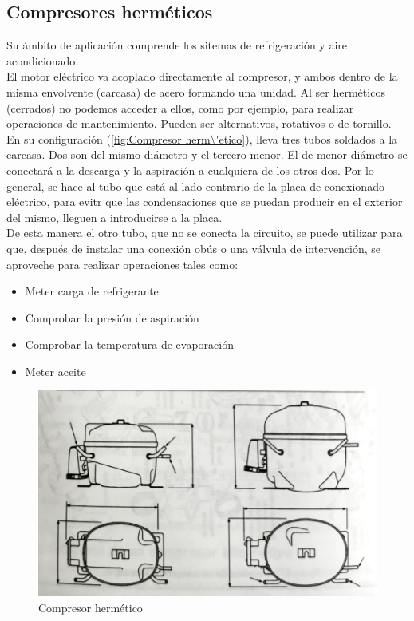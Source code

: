\subsection{Compresores herméticos}
Su \'ambito de aplicaci\'on comprende los sitemas de refrigeraci\'on y aire acondicionado.\\El motor el\'ectrico va acoplado directamente al compresor, y ambos dentro de la misma envolvente (carcasa) de acero formando una unidad. Al ser herm\'eticos (cerrados) no podemos acceder a ellos, como por ejemplo, para realizar operaciones de mantenimiento. Pueden ser alternativos, rotativos o de tornillo.\\ En su configuraci\'on (\autoref{fig:Compresor herm\'etico}), lleva tres tubos soldados a la carcasa. Dos son del mismo di\'ametro y el tercero menor. El de menor di\'ametro se conectar\'a a la descarga y la aspiraci\'on a cualquiera de los otros dos. Por lo general, se hace al tubo que est\'a al lado contrario de la placa de conexionado el\'ectrico, para evitr que las condensaciones que se puedan producir en el exterior del mismo, lleguen a introducirse a la placa.\\ De esta manera el otro tubo, que no se conecta la circuito, se puede utilizar para que, despu\'es de instalar una conexi\'on ob\'us o una v\'alvula de intervenci\'on, se aproveche para realizar operaciones tales como:
\begin{itemize}
	\item Meter carga de refrigerante
	\item Comprobar la presi\'on de aspiraci\'on
	\item Comprobar la temperatura de evaporaci\'on
	\item Meter aceite
\end{itemize}
\begin{figure}[H]
	\centering
	\includegraphics[width=.8\linewidth]{figuras/compresores/compresor herméticos.jpg}
	\caption{Compresor herm\'etico}
	\label{fig:Compresor herm\'etico}
\end{figure}
